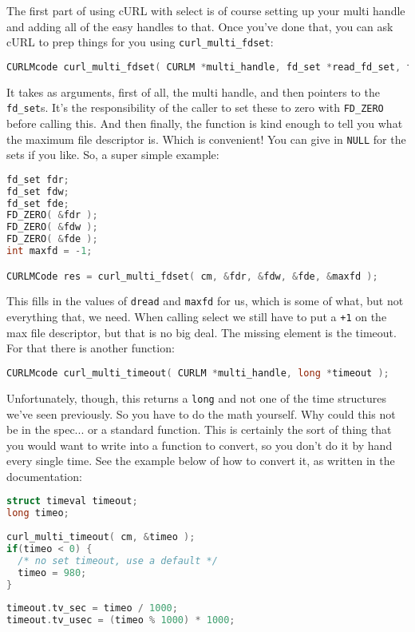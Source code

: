 The first part of using cURL with select is of course setting up your multi handle and adding all of the easy handles to that. Once you've done that, you can ask cURL to prep things for you using \texttt{curl\_multi\_fdset}:

\begin{lstlisting}[language=C]
CURLMcode curl_multi_fdset( CURLM *multi_handle, fd_set *read_fd_set, fd_set *write_fd_set, fd_set *exc_fd_set, int *max_fd );
\end{lstlisting}

It takes as arguments, first of all, the multi handle, and then pointers to the \texttt{fd\_set}s. It's the responsibility of the caller to set these to zero with \texttt{FD\_ZERO} before calling this. And then finally, the function is kind enough to tell you what the maximum file descriptor is. Which is convenient! You can give in \texttt{NULL} for the sets if you like. So, a super simple example:

\begin{lstlisting}[language=C]
fd_set fdr;
fd_set fdw;
fd_set fde;
FD_ZERO( &fdr );
FD_ZERO( &fdw );
FD_ZERO( &fde );
int maxfd = -1;

CURLMCode res = curl_multi_fdset( cm, &fdr, &fdw, &fde, &maxfd );
\end{lstlisting}

This fills in the values of \texttt{dread} and \texttt{maxfd} for us, which is some of what, but not everything that, we need. When calling select we still have to put a \texttt{+1} on the max file descriptor, but that is no big deal. The missing element is the timeout. For that there is another function:

\begin{lstlisting}[language=C]
CURLMcode curl_multi_timeout( CURLM *multi_handle, long *timeout );
\end{lstlisting}

Unfortunately, though, this returns a \texttt{long} and not one of the time structures we've seen previously. So you have to do the math yourself. Why could this not be in the spec... or a standard function. This is certainly the sort of thing that you would want to write into a function to convert, so you don't do it by hand every single time. See the example below of how to convert it, as written in the documentation:

\begin{lstlisting}[language=C]
struct timeval timeout;
long timeo;
 
curl_multi_timeout( cm, &timeo );
if(timeo < 0) {
  /* no set timeout, use a default */
  timeo = 980;
}
 
timeout.tv_sec = timeo / 1000;
timeout.tv_usec = (timeo % 1000) * 1000;
\end{lstlisting}

